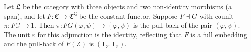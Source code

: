 Let $\mathfrak{L}$ be the category with three objects and two non-identity morphisms (a span), and let $F: \mathfrak{C} \to \mathfrak{C}^{\mathfrak{L}}$ be the constant functor. Suppose $F \dashv G$ with counit $\pi: FG \to 1$. Then $\pi: FG(\varphi, \psi) \to (\varphi, \psi)$ is the pull-back of the pair $(\varphi, \psi)$. The unit $\varepsilon$ for this adjunction is the identity, reflecting that $F$ is a full embedding and the pull-back of $F(Z)$ is $(1_Z, 1_Z)$.
